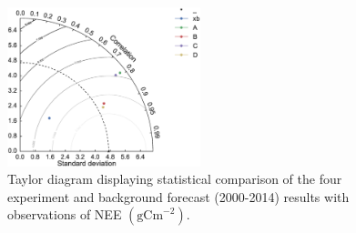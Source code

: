 \documentclass[11pt]{article}
\begin{document}
\begin{figure}[ht]
    \centering
    \includegraphics[width=0.5\textwidth]{taylordiag.eps}
    \caption{Taylor diagram displaying statistical comparison of the four experiment and background forecast (2000-2014) results with observations of NEE $( \text{gCm}^{-2})$.}
    \label{fig:taylordiag}
\end{figure}
\end{document}

